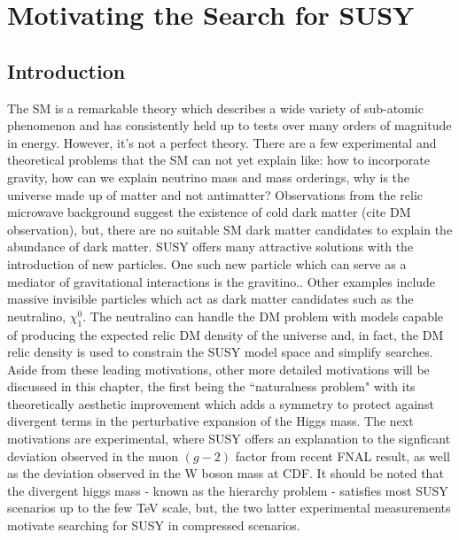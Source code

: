 
\setcounter{secnumdepth}{3}
\setcounter{tocdepth}{3}

\setlength{\parindent}{1 em}


\makeatother


\chapter{Motivating the Search for SUSY}


\section{Introduction}

The SM is a remarkable theory which describes a wide variety of sub-atomic phenomenon and has consistently held up to tests over many orders of magnitude in energy. However, it's not a perfect theory. There are a few  experimental and theoretical problems that the SM can not yet explain like: how to incorporate gravity,  how can we explain neutrino mass and mass orderings, why is the universe made up of matter and not antimatter?   Observations from the relic microwave background suggest the existence of cold dark matter (cite DM observation), but, there are no suitable SM dark matter candidates to explain the abundance of dark matter. SUSY offers many attractive solutions with the introduction of new particles. One such new particle which can serve as a mediator of gravitational interactions is the gravitino.. Other examples include  massive invisible particles which act as dark matter candidates such as the neutralino, $\chi_1^0$. The neutralino can handle the DM problem with models capable of producing the expected relic DM density of the universe and, in fact, the DM relic density is used to constrain the SUSY model space and simplify searches. Aside from these leading motivations, other more detailed motivations will be discussed in this chapter, the first being the ``naturalness problem" with its theoretically aesthetic improvement which adds a symmetry to protect against divergent terms in the perturbative expansion of the Higgs mass. The next motivations are experimental, where SUSY offers an explanation to the signficant deviation observed in the muon $(g-2)$ factor from recent FNAL result, as well as the deviation observed in the W boson mass at CDF. It should be noted that the divergent higgs mass - known as the hierarchy problem - satisfies most SUSY scenarios up to the few TeV scale, but, the two latter experimental measurements motivate searching for SUSY in compressed scenarios.



